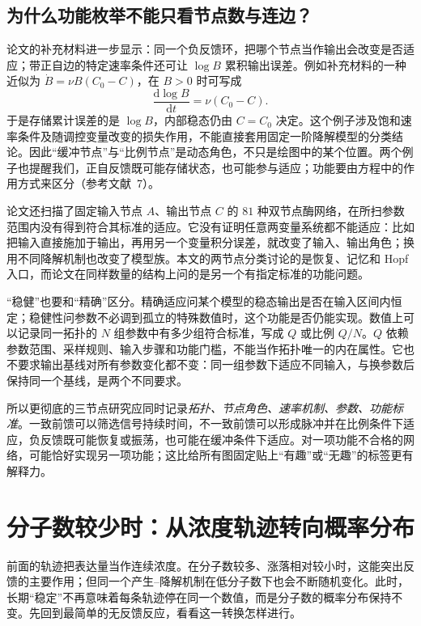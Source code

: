 \documentclass[11pt,a4paper,UTF8,fontset=fandol]{ctexart}
\newcommand{\dd}{\mathrm d}\newcommand{\R}{\mathbb R}\newcommand{\ssv}{\mathrm{ss}}
\begin{document}
\subsection{为什么功能枚举不能只看节点数与连边？}
论文的补充材料进一步显示：同一个负反馈环，把哪个节点当作输出会改变是否适应；带正自边的特定速率条件还可让 $\log B$ 累积输出误差。例如补充材料的一种近似为 $\dot B=\nu B(C_0-C)$，在 $B>0$ 时可写成
\[
\frac{\dd\log B}{\dd t}=\nu(C_0-C).
\]
于是存储累计误差的是 $\log B$，内部稳态仍由 $C=C_0$ 决定。这个例子涉及饱和速率条件及随调控变量改变的损失作用，不能直接套用固定一阶降解模型的分类结论。因此“缓冲节点”与“比例节点”是动态角色，不只是绘图中的某个位置。两个例子也提醒我们，正自反馈既可能存储状态，也可能参与适应；功能要由方程中的作用方式来区分（参考文献~7）。

论文还扫描了固定输入节点 $A$、输出节点 $C$ 的 $81$ 种双节点酶网络，在所扫参数范围内没有得到符合其标准的适应。它没有证明任意两变量系统都不能适应：比如把输入直接施加于输出，再用另一个变量积分误差，就改变了输入、输出角色；换用不同降解机制也改变了模型族。本文的两节点分类讨论的是恢复、记忆和 Hopf 入口，而论文在同样数量的结构上问的是另一个有指定标准的功能问题。

“稳健”也要和“精确”区分。精确适应问某个模型的稳态输出是否在输入区间内恒定；稳健性问参数不必调到孤立的特殊数值时，这个功能是否仍能实现。数值上可以记录同一拓扑的 $N$ 组参数中有多少组符合标准，写成 $Q$ 或比例 $Q/N$。$Q$ 依赖参数范围、采样规则、输入步骤和功能门槛，不能当作拓扑唯一的内在属性。它也不要求输出基线对所有参数变化都不变：同一组参数下适应不同输入，与换参数后保持同一个基线，是两个不同要求。

所以更彻底的三节点研究应同时记录\emph{拓扑、节点角色、速率机制、参数、功能标准}。一致前馈可以筛选信号持续时间，不一致前馈可以形成脉冲并在比例条件下适应，负反馈既可能恢复或振荡，也可能在缓冲条件下适应。对一项功能不合格的网络，可能恰好实现另一项功能；这比给所有图固定贴上“有趣”或“无趣”的标签更有解释力。

\section{分子数较少时：从浓度轨迹转向概率分布}
前面的轨迹把表达量当作连续浓度。在分子数较多、涨落相对较小时，这能突出反馈的主要作用；但同一个产生--降解机制在低分子数下也会不断随机变化。此时，长期“稳定”不再意味着每条轨迹停在同一个数值，而是分子数的概率分布保持不变。先回到最简单的无反馈反应，看看这一转换怎样进行。
\end{document}
